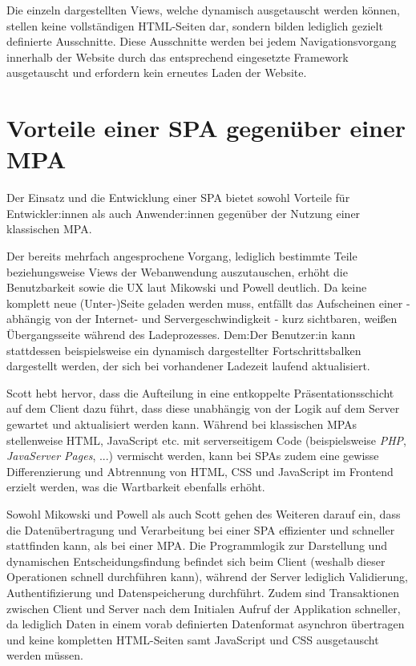 \documentclass[a4paper,12pt,twoside]{scrreprt}
\begin{document}
\medskip

Die einzeln dargestellten Views, welche dynamisch ausgetauscht werden können, stellen keine vollständigen HTML-Seiten dar, sondern bilden lediglich gezielt definierte Ausschnitte. Diese Ausschnitte werden bei jedem Navigationsvorgang innerhalb der Website durch das entsprechend eingesetzte Framework ausgetauscht und erfordern kein erneutes Laden der Website. \parencite[][Seite 10f.]{scott_spa_2015}

\section{Vorteile einer \acs{SPA} gegenüber einer \acs{MPA}}
\label{sec:vorteile-spa-mpa}
Der Einsatz und die Entwicklung einer \ac{SPA} bietet sowohl Vorteile für Entwickler:innen als auch Anwender:innen gegenüber der Nutzung einer klassischen \ac{MPA}.

Der bereits mehrfach angesprochene Vorgang, lediglich bestimmte Teile beziehungsweise Views der Webanwendung auszutauschen, erhöht die Benutzbarkeit sowie die \ac{UX} laut Mikowski und Powell deutlich. Da keine komplett neue (Unter-)Seite geladen werden muss, entfällt das Aufscheinen einer - abhängig von der Internet- und Servergeschwindigkeit - kurz sichtbaren, weißen Übergangsseite während des Ladeprozesses. Dem:Der Benutzer:in kann stattdessen beispielsweise ein dynamisch dargestellter Fortschrittsbalken dargestellt werden, der sich bei vorhandener Ladezeit laufend aktualisiert. \parencite[][Seite 20]{mikowski_single_2013}

Scott hebt hervor, dass die Aufteilung in eine entkoppelte Präsentationsschicht auf dem Client dazu führt, dass diese unabhängig von der Logik auf dem Server gewartet und aktualisiert werden kann. Während bei klassischen \acsp{MPA} stellenweise HTML, JavaScript etc. mit serverseitigem Code (beispielsweise \textit{PHP}, \textit{JavaServer Pages}, ...) vermischt werden, kann bei \acsp{SPA} zudem eine gewisse Differenzierung und Abtrennung von HTML, CSS und JavaScript im Frontend erzielt werden, was die Wartbarkeit ebenfalls erhöht. \parencite[][Seite 13]{scott_spa_2015}

\newpage

Sowohl Mikowski und Powell als auch Scott gehen des Weiteren darauf ein, dass die Datenübertragung und Verarbeitung bei einer \ac{SPA} effizienter und schneller stattfinden kann, als bei einer \ac{MPA}. Die Programmlogik zur Darstellung und dynamischen Entscheidungsfindung befindet sich beim Client (weshalb dieser Operationen schnell durchführen kann), während der Server lediglich Validierung, Authentifizierung und Datenspeicherung durchführt. \parencite[][Seite 20]{mikowski_single_2013} Zudem sind Transaktionen zwischen Client und Server nach dem Initialen Aufruf der Applikation schneller, da lediglich Daten in einem vorab definierten Datenformat asynchron übertragen und keine kompletten HTML-Seiten samt JavaScript und CSS ausgetauscht werden müssen. \parencite[][Seite 13]{scott_spa_2015}
\end{document}
